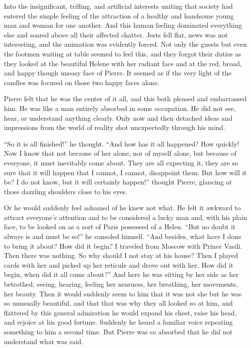 Into the insignificant, trifling, and artificial interests
uniting that society had entered the simple feeling of the
attraction of a healthy and handsome young man and woman for one
another. And this human feeling dominated everything else and
soared above all their affected chatter.  Jests fell flat, news
was not interesting, and the animation was evidently forced. Not
only the guests but even the footmen waiting at table seemed to
feel this, and they forgot their duties as they looked at the
beautiful Helene with her radiant face and at the red, broad, and
happy though uneasy face of Pierre. It seemed as if the very
light of the candles was focused on those two happy faces alone.

Pierre felt that he was the center of it all, and this both
pleased and embarrassed him. He was like a man entirely absorbed
in some occupation.  He did not see, hear, or understand anything
clearly. Only now and then detached ideas and impressions from
the world of reality shot unexpectedly through his mind.

``So it is all finished!'' he thought. ``And how has it all
happened? How quickly! Now I know that not because of her alone,
nor of myself alone, but because of everyone, it must inevitably
come about. They are all expecting it, they are so sure that it
will happen that I cannot, I cannot, disappoint them. But how
will it be? I do not know, but it will certainly happen!''
thought Pierre, glancing at those dazzling shoulders close to his
eyes.

Or he would suddenly feel ashamed of he knew not what. He felt it
awkward to attract everyone's attention and to be considered a
lucky man and, with his plain face, to be looked on as a sort of
Paris possessed of a Helen. ``But no doubt it always is and must
be so!'' he consoled himself. ``And besides, what have I done to
bring it about? How did it begin? I traveled from Moscow with
Prince Vasili. Then there was nothing. So why should I not stay
at his house? Then I played cards with her and picked up her
reticule and drove out with her. How did it begin, when did it
all come about?'' And here he was sitting by her side as her
betrothed, seeing, hearing, feeling her nearness, her breathing,
her movements, her beauty. Then it would suddenly seem to him
that it was not she but he was so unusually beautiful, and that
that was why they all looked so at him, and flattered by this
general admiration he would expand his chest, raise his head, and
rejoice at his good fortune.  Suddenly he heard a familiar voice
repeating something to him a second time. But Pierre was so
absorbed that he did not understand what was said.

